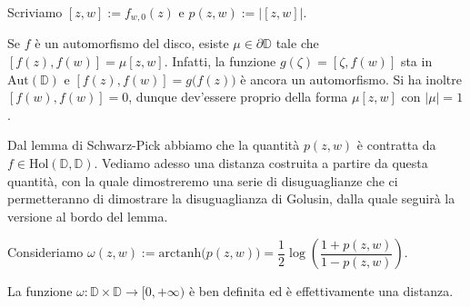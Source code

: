 \begin{defn}
  Scriviamo $[z,w]:=f_{w,0}(z)$ e $p(z,w):=|[z,w]|$.
\end{defn}

\begin{oss} \label{muu}
  Se $f$ è un automorfismo del disco, esiste $\mu \in \partial \mathbb{D}$ tale che $[f(z),f(w)]=\mu[z,w]$. Infatti, la funzione $g(\zeta)=[\zeta,f(w)]$ sta in $\text{Aut}(\mathbb{D})$ e $[f(z),f(w)]=g\bigl(f(z)\bigr)$ è ancora un automorfismo. Si ha inoltre $[f(w),f(w)]=0$, dunque dev'essere proprio della forma $\mu[z,w]$ con $|\mu|=1$.
\end{oss}

Dal lemma di Schwarz-Pick abbiamo che la quantità $p(z,w)$ è contratta da $f \in \text{Hol}(\mathbb{D}, \mathbb{D})$. Vediamo adesso una distanza costruita a partire da questa quantità, con la quale dimostreremo una serie di disuguaglianze che ci permetteranno di dimostrare la disuguaglianza di Golusin, dalla quale seguirà la versione al bordo del lemma.

 Consideriamo $\omega(z,w):=\text{arctanh}\bigl(p(z,w)\bigr)=\dfrac{1}{2}\log\left(\dfrac{1+p(z,w)}{1-p(z,w)}\right)$.

\begin{prop} \label{eunadistanza}
  La funzione $\omega: \mathbb{D}\times \mathbb{D} \longrightarrow [0,+\infty)$ è ben definita ed è effettivamente una distanza.
\end{prop}

